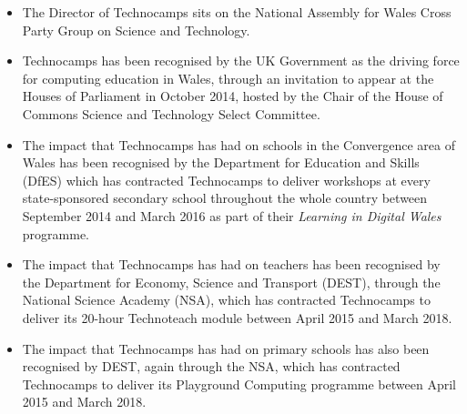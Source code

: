 \documentclass{sig-alternate}
\begin{document}
\begin{itemize}
\item
The Director of Technocamps sits on
the National Assembly for Wales Cross Party Group on Science and Technology.

\item
Technocamps has been recognised by the UK Government as the driving
force for computing education in Wales, through an invitation to
appear at the Houses of Parliament in October 2014, hosted by the
Chair of the House of Commons Science and Technology Select Committee.

\item
The impact that Technocamps has had on schools in the Convergence area
of Wales has been recognised by the Department for Education and Skills (DfES)
which has contracted Technocamps to deliver workshops at every
state-sponsored secondary school throughout the whole country between
September 2014 and March 2016 as part of their \emph{Learning in
Digital Wales} programme.

\item
The impact that Technocamps has had on teachers has been recognised by
the Department for Economy, Science and Transport (DEST), through the
National Science Academy (NSA), which has contracted Technocamps to deliver
its 20-hour Technoteach module between April 2015 and March 2018.

\item
The impact that Technocamps has had on primary schools has also been
recognised by DEST, again through the NSA, which has contracted
Technocamps to deliver its Playground Computing programme between
April 2015 and March 2018.

\end{itemize}
\end{document}

